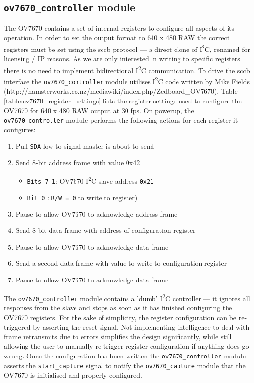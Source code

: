 \subsection{\texttt{ov7670\_controller} module}
The OV7670 contains a set of internal registers to configure all aspects of its operation. In order to set the output format to 640 x 480 RAW the correct registers must be set using the \gls{sccb} protocol --- a direct clone of I\textsuperscript{2}C, renamed for licensing / IP reasons. As we are only interested in writing to specific registers there is no need to implement bidirectional I\textsuperscript{2}C communication. To drive the \gls{sccb} interface the \texttt{ov7670\_controller} module utilises I\textsuperscript{2}C code written by Mike Fields (http://hamsterworks.co.nz/mediawiki/index.php/Zedboard\_OV7670). Table \ref{table:ov7670_register_settings} lists the register settings used to configure the OV7670 for 640 x 480 RAW output at 30 \gls{fps}. On powerup, the \texttt{ov7670\_controller} module performs the following actions for each register it configures:

\begin{enumerate}
    \item Pull \texttt{SDA} low to signal master is about to send
    \item Send 8-bit address frame with value 0x42
        \begin{itemize}
            \item \texttt{Bits 7--1}: OV7670 I\textsuperscript{2}C slave address \texttt{0x21}
            \item \texttt{Bit 0}    : \texttt{R/W = 0} to write to register) 
        \end{itemize}
    \item Pause to allow OV7670 to acknowledge address frame
    \item Send 8-bit data frame with address of configuration register
    \item Pause to allow OV7670 to acknowledge data frame
    \item Send a second data frame with value to write to configuration register
    \item Pause to allow OV7670 to acknowledge data frame
\end{enumerate}

The \texttt{ov7670\_controller} module contains a 'dumb' I\textsuperscript{2}C controller --- it ignores all responses from the slave and stops as soon as it has finished configuring the OV7670 registers. For the sake of simplicity, the register configuration can be re-triggered by asserting the reset signal. Not implementing intelligence to deal with frame retransmits due to errors simplifies the design significantly, while still allowing the user to manually re-trigger register configuration if anything does go wrong. Once the configuration has been written the \texttt{ov7670\_controller} module asserts the \texttt{start\_capture} signal to notify the \texttt{ov7670\_capture} module that the OV7670 is initialised and properly configured.

